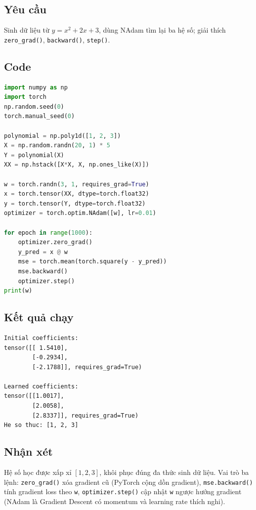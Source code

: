 \documentclass[a4paper,13pt]{article}
\begin{document}
\subsection{Yêu cầu}
Sinh dữ liệu từ $y=x^2+2x+3$, dùng NAdam tìm lại ba hệ số; giải thích \texttt{zero\_grad()}, \texttt{backward()}, \texttt{step()}.

\subsection{Code}
\begin{lstlisting}[language=Python]
import numpy as np
import torch
np.random.seed(0)
torch.manual_seed(0)

polynomial = np.poly1d([1, 2, 3])
X = np.random.randn(20, 1) * 5
Y = polynomial(X)
XX = np.hstack([X*X, X, np.ones_like(X)])

w = torch.randn(3, 1, requires_grad=True)
x = torch.tensor(XX, dtype=torch.float32)
y = torch.tensor(Y, dtype=torch.float32)
optimizer = torch.optim.NAdam([w], lr=0.01)

for epoch in range(1000):
    optimizer.zero_grad()
    y_pred = x @ w
    mse = torch.mean(torch.square(y - y_pred))
    mse.backward()
    optimizer.step()
print(w)
\end{lstlisting}

\subsection{Kết quả chạy}
\begin{lstlisting}[backgroundcolor=\color{outgray}]
Initial coefficients:
tensor([[ 1.5410],
        [-0.2934],
        [-2.1788]], requires_grad=True)

Learned coefficients:
tensor([[1.0017],
        [2.0058],
        [2.8337]], requires_grad=True)
He so thuc: [1, 2, 3]
\end{lstlisting}

\subsection{Nhận xét}
Hệ số học được xấp xỉ $[1, 2, 3]$, khôi phục đúng đa thức sinh dữ liệu. Vai trò ba lệnh: \texttt{zero\_grad()} xóa gradient cũ (PyTorch cộng dồn gradient), \texttt{mse.backward()} tính gradient loss theo \texttt{w}, \texttt{optimizer.step()} cập nhật \texttt{w} ngược hướng gradient (NAdam là Gradient Descent có momentum và learning rate thích nghi).

\newpage
\end{document}
